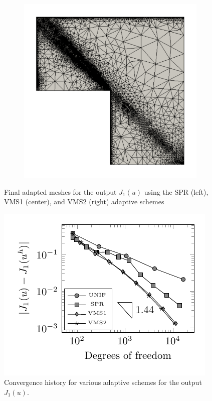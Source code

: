 \begin{figure}[hbt!]
\begin{subfigure}{.3\textwidth}
\end{subfigure}%
\begin{subfigure}{.3\textwidth}
\centering
\includegraphics[width=.99\linewidth]{img/vms_lshape_global_vms2_final}
\end{subfigure}
\caption{Final adapted meshes for the output $J_1(u)$ using
the SPR (left), VMS1 (center), and VMS2 (right) adaptive schemes}
\label{fig:J1_meshes}
\end{figure}

\begin{figure}[hbt!]
\centering
\includegraphics[width=.5\linewidth]{img/vms_lshape_global_convergence}
\caption{Convergence history for various adaptive schemes for
the output $J_1(u)$.}
\label{fig:J1_convergence}
\end{figure}

